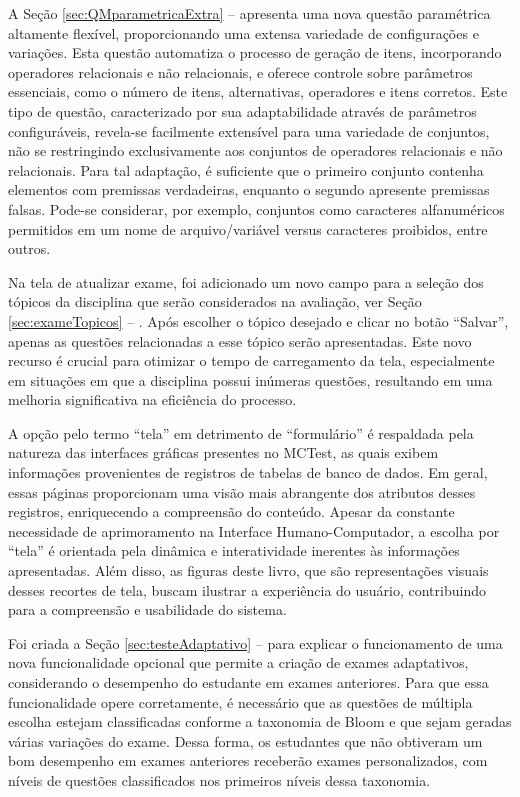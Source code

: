 A Seção \ref{sec:QMparametricaExtra} --  apresenta uma nova questão paramétrica altamente flexível, proporcionando uma extensa variedade de configurações e variações. Esta questão automatiza o processo de geração de itens, incorporando operadores relacionais e não relacionais, e oferece controle sobre parâmetros essenciais, como o número de itens, alternativas, operadores e itens corretos. Este tipo de questão, caracterizado por sua adaptabilidade através de parâmetros configuráveis, revela-se facilmente extensível para uma variedade de conjuntos, não se restringindo exclusivamente aos conjuntos de operadores relacionais e não relacionais. Para tal adaptação, é suficiente que o primeiro conjunto contenha elementos com premissas verdadeiras, enquanto o segundo apresente premissas falsas. Pode-se considerar, por exemplo, conjuntos como caracteres alfanuméricos permitidos em um nome de arquivo/variável versus caracteres proibidos, entre outros.


Na tela de atualizar exame, foi adicionado um novo campo para a seleção dos tópicos da disciplina que serão considerados na avaliação, ver Seção \ref{sec:exameTopicos} -- . Após escolher o tópico desejado e clicar no botão ``Salvar'', apenas as questões relacionadas a esse tópico serão apresentadas. Este novo recurso é crucial para otimizar o tempo de carregamento da tela, especialmente em situações em que a disciplina possui inúmeras questões, resultando em uma melhoria significativa na eficiência do processo.

A opção pelo termo ``tela'' em detrimento de ``formulário'' é respaldada pela natureza das interfaces gráficas presentes no MCTest, as quais exibem informações provenientes de registros de tabelas de banco de dados. Em geral, essas páginas proporcionam uma visão mais abrangente dos atributos desses registros, enriquecendo a compreensão do conteúdo. Apesar da constante necessidade de aprimoramento na Interface Humano-Computador, a escolha por ``tela'' é orientada pela dinâmica e interatividade inerentes às informações apresentadas. Além disso, as figuras deste livro, que são representações visuais desses recortes de tela, buscam ilustrar a experiência do usuário, contribuindo para a compreensão e usabilidade do sistema.

Foi criada a Seção \ref{sec:testeAdaptativo} --  para explicar o funcionamento de uma nova funcionalidade opcional que permite a criação de exames adaptativos, considerando o desempenho do estudante em exames anteriores. Para que essa funcionalidade opere corretamente, é necessário que as questões de múltipla escolha estejam classificadas conforme a taxonomia de Bloom e que sejam geradas várias variações do exame. Dessa forma, os estudantes que não obtiveram um bom desempenho em exames anteriores receberão exames personalizados, com níveis de questões classificados nos primeiros níveis dessa taxonomia.


